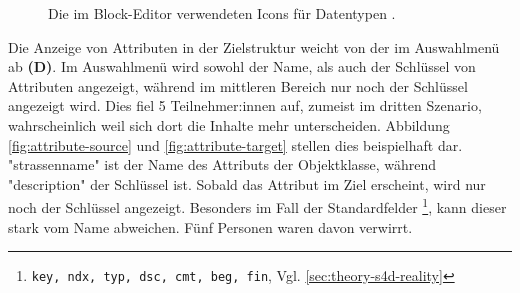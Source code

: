 \begin{figure}
  \centering
  \caption{Die im Block-Editor verwendeten Icons für Datentypen .}
  \label{fig:icons}
\end{figure}

Die Anzeige von Attributen in der Zielstruktur weicht von der im Auswahlmenü ab \textbf{(D)}. Im Auswahlmenü wird sowohl der Name, als auch der Schlüssel von Attributen angezeigt, während im mittleren Bereich nur noch der Schlüssel angezeigt wird. Dies fiel 5 Teilnehmer:innen auf, zumeist im dritten Szenario, wahrscheinlich weil sich dort die Inhalte mehr unterscheiden. Abbildung \ref{fig:attribute-source} und \ref{fig:attribute-target} stellen dies beispielhaft dar. "strassenname" ist der Name des Attributs der Objektklasse, während "description" der Schlüssel ist. Sobald das Attribut im Ziel erscheint, wird nur noch der Schlüssel angezeigt. Besonders im Fall der Standardfelder \footnote{\texttt{key, ndx, typ, dsc, cmt, beg, fin}, Vgl. \ref{sec:theory-s4d-reality}}, kann dieser stark vom Name abweichen. Fünf Personen waren davon verwirrt.


